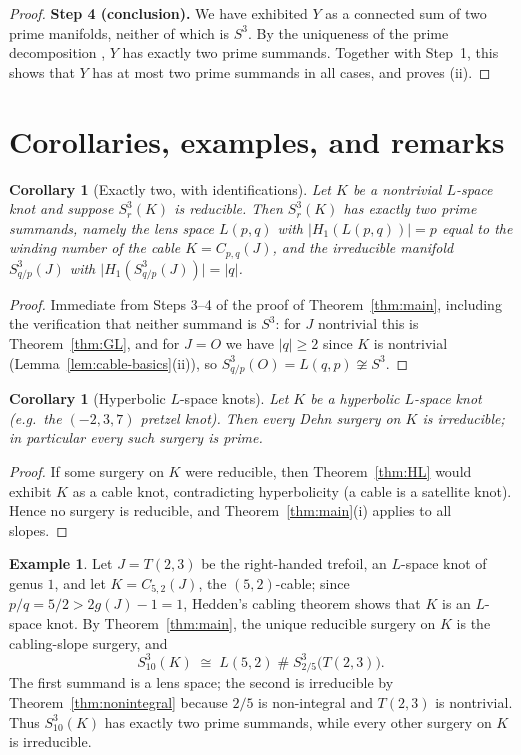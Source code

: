 \documentclass[11pt]{article}
\newtheorem{corollary}[theorem]{Corollary}
\theoremstyle{definition}
\newtheorem{example}[theorem]{Example}
\theoremstyle{remark}
\numberwithin{equation}{section}
\begin{document}
\begin{proof}
\medskip
\noindent\textbf{Step 4 (conclusion).}
We have exhibited $Y$ as a connected sum of two prime manifolds, neither
of which is $S^{3}$.  By the uniqueness of the prime decomposition
\cite{Mi62,He76}, $Y$ has exactly two prime summands.  Together with
Step~1, this shows that $Y$ has at most two prime summands in all cases,
and proves (ii).
\end{proof}

\section{Corollaries, examples, and remarks}\label{sec:remarks}

\begin{corollary}[Exactly two, with identifications]\label{cor:exact}
Let $K$ be a nontrivial $L$-space knot and suppose $S^{3}_{r}(K)$ is
reducible.  Then $S^{3}_{r}(K)$ has exactly two prime summands, namely
the lens space $L(p,q)$ with
$\bigl|H_{1}(L(p,q))\bigr|=p$ equal to the winding number of the cable
$K=C_{p,q}(J)$, and the irreducible manifold $S^{3}_{q/p}(J)$ with
$\bigl|H_{1}(S^{3}_{q/p}(J))\bigr|=|q|$.
\end{corollary}

\begin{proof}
Immediate from Steps 3--4 of the proof of Theorem~\ref{thm:main},
including the verification that neither summand is $S^{3}$: for $J$
nontrivial this is Theorem~\ref{thm:GL}, and for $J=O$ we have
$|q|\ge2$ since $K$ is nontrivial
(Lemma~\ref{lem:cable-basics}(ii)), so $S^{3}_{q/p}(O)=L(q,p)\not\cong
S^{3}$.
\end{proof}

\begin{corollary}[Hyperbolic $L$-space knots]\label{cor:hyperbolic}
Let $K$ be a hyperbolic $L$-space knot (e.g.\ the $(-2,3,7)$ pretzel
knot).  Then every Dehn surgery on $K$ is irreducible; in particular
every such surgery is prime.
\end{corollary}

\begin{proof}
If some surgery on $K$ were reducible, then Theorem~\ref{thm:HL} would
exhibit $K$ as a cable knot, contradicting hyperbolicity (a cable is a
satellite knot).  Hence no surgery is reducible, and
Theorem~\ref{thm:main}(i) applies to all slopes.
\end{proof}

\begin{example}\label{ex:cable-of-trefoil}
Let $J=T(2,3)$ be the right-handed trefoil, an $L$-space knot of genus
$1$, and let $K=C_{5,2}(J)$, the $(5,2)$-cable; since $p/q=5/2>
2g(J)-1=1$, Hedden's cabling theorem shows that $K$ is an $L$-space
knot.  By Theorem~\ref{thm:main}, the unique reducible surgery on $K$
is the cabling-slope surgery, and
\[
S^{3}_{10}(K)\;\cong\;L(5,2)\;\#\;S^{3}_{2/5}\bigl(T(2,3)\bigr).
\]
The first summand is a lens space; the second is irreducible by
Theorem~\ref{thm:nonintegral} because $2/5$ is non-integral and $T(2,3)$
is nontrivial.  Thus $S^{3}_{10}(K)$ has exactly two prime summands, while
every other surgery on $K$ is irreducible.
\end{example}
\end{document}
